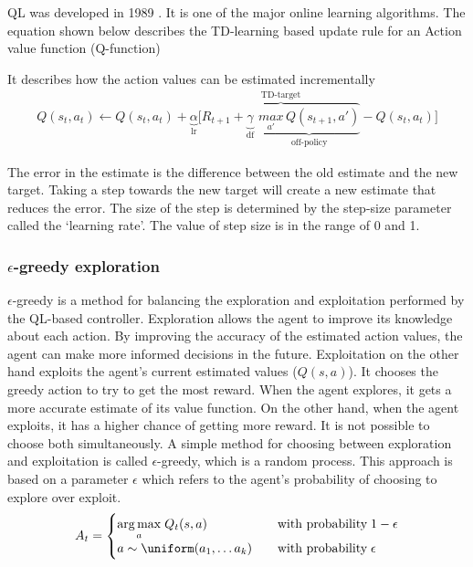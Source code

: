 QL was developed in 1989 \parencite{watkins1992q}. It is one of the major online learning algorithms. The equation shown below describes the TD-learning based update rule for an Action value function (Q-function) 

It describes how the action values can be estimated incrementally
\begin{align}
    Q(s_t, a_t) \leftarrow Q(s_t, a_t) + \underbrace{\alpha}_\text{lr} \Big[ \overbrace{R_{t+1} + \underbrace{\gamma}_\text{df} \hspace{4pt} \underbrace{\underset{a'}{max} \hspace{2pt} Q(s_{t+1}, a')}_\text{off-policy}}^\text{TD-target} - Q(s_t, a_t) \Big]
\end{align}

The error in the estimate is the difference between the old estimate and the new target. Taking a step towards the new target will create a new estimate that reduces the error. The size of the step is determined by the step-size parameter called the `learning rate'. The value of step size is in the range of 0 and 1.

\subsubsection{$\epsilon$-greedy exploration}
$\epsilon$-greedy is a method for balancing the exploration and exploitation performed by the QL-based controller. Exploration allows the agent to improve its knowledge about each action. By improving the accuracy of the estimated action values, the agent can make more informed decisions in the future. Exploitation on the other hand exploits the agent's current estimated values ($Q(s, a)$). It chooses the greedy action to try to get the most reward. When the agent explores, it gets a more accurate estimate of its value function. On the other hand, when the agent exploits, it has a higher chance of getting more reward. It is not possible to choose both simultaneously. A simple method for choosing between exploration and exploitation is called $\epsilon$-greedy, which is a random process. 
This approach is based on a parameter $\epsilon$ which refers to the agent's probability of choosing to explore over exploit.
\begin{align}
    A_t  = 
    \begin{cases}
        \underset{a}{\arg\max} \; Q_t(s, a) \quad & \text{with probability} \; 1- \epsilon \\
        a \sim \uniform (a_1, \hdots a_k) \quad & \text{with probability} \; \epsilon
    \end{cases}
\end{align}

